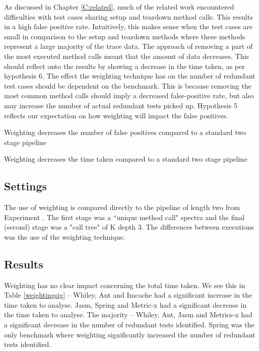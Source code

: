 As discussed in Chapter \ref{C:related}, much of the related work encountered difficulties with test cases sharing setup and teardown method calls. This results in a high false positive rate. Intuitively, this makes sense when the test cases are small in comparison to the setup and teardown methods where these methods represent a large majority of the trace data. The approach of removing a part of the most executed method calls meant that the amount of data decreases. This should reflect onto the results by showing a decrease in the time taken, as per hypothesis 6. The effect the weighting technique has on the number of redundant test cases should be dependent on the benchmark. This is because removing the most common method calls should imply a decreased false-positive rate, but also may increase the number of actual redundant tests picked up. Hypothesis 5 reflects our expectation on how weighting will impact the false positives.

\begin{hyp}
Weighting decreases the number of false positives compared to a standard two stage pipeline
\end{hyp}

\begin{hyp}
Weighting decreases the time taken compared to a standard two stage pipeline
\end{hyp}

\subsection{Settings}
The use of weighting is compared directly to the pipeline of length two from Experiment . The first stage was a ``unique method call" spectra and the final (second) stage was a "call tree" of K depth 3. The differences between executions was the use of the weighting technique.


\subsection{Results}
Weighting has no clear impact concerning the total time taken. We see this in Table \ref{weightingsig} -- Whiley, Ant and Imcache had a significant increase in the time taken to analyse. Jasm, Spring and Metric-x had a significant decrease in the time taken to analyse. The majority -- Whiley, Ant, Jasm and Metrics-x had a significant decrease in the number of redundant tests identified. Spring was the only benchmark where weighting significantly increased the number of redundant tests identified.

